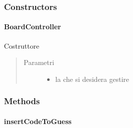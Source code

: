 \documentclass[letterpaper,10pt,italian,openany,oneside]{sphinxmanual}
\begin{document}
\subsubsection{Constructors}
\label{\detokenize{source/it/unicam/cs/pa/mastermind/gamecore/BoardController:constructors}}

\paragraph{BoardController}
\label{\detokenize{source/it/unicam/cs/pa/mastermind/gamecore/BoardController:id1}}

\begin{fulllineitems}
\label{\detokenize{source/it/unicam/cs/pa/mastermind/gamecore/BoardController:it.unicam.cs.pa.mastermind.gamecore.BoardController.BoardController(BoardModel)}}
Costruttore
\begin{quote}\begin{description}
\item[{Parametri}] \leavevmode\begin{itemize}
\item {} 
 \textendash{} la  che si desidera gestire

\end{itemize}

\end{description}\end{quote}

\end{fulllineitems}



\subsubsection{Methods}
\label{\detokenize{source/it/unicam/cs/pa/mastermind/gamecore/BoardController:methods}}

\paragraph{insertCodeToGuess}
\label{\detokenize{source/it/unicam/cs/pa/mastermind/gamecore/BoardController:insertcodetoguess}}
\end{document}
